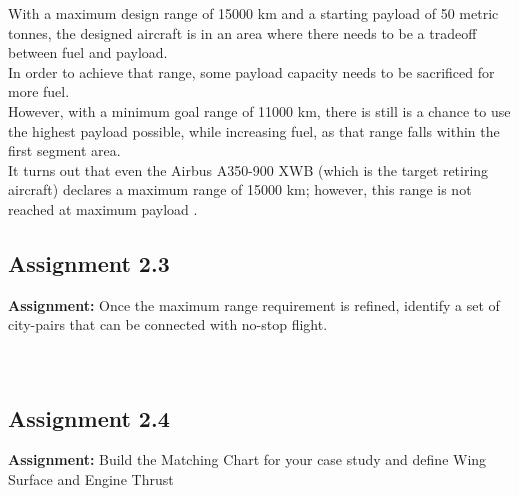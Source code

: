 \documentclass{article}
\begin{document}
With a maximum design range of 15000 km and a starting payload of 50 metric tonnes, 
the designed aircraft is in an area where there needs to be a tradeoff between fuel and payload.\\ 
In order to achieve that range, some payload capacity needs to be sacrificed for more fuel.\\ 
However, with a minimum goal range of 11000 km, there is still is a chance to use the highest payload possible,
while increasing fuel, as that range falls within the first segment area. \\ 
It turns out that even the Airbus A350-900 XWB (which is the target retiring aircraft) declares
a maximum range of 15000 km; however, this range is not reached at maximum payload \autocite{Airbus_A350-900}.

\pagebreak
\subsection{Assignment 2.3\label{Assignment_2.3}}
\textbf{Assignment:} Once the maximum range requirement is refined,
 identify a set of city-pairs that can be connected with no-stop flight. \\ \\ \\ 
\pagebreak 

\subsection{Assignment 2.4\label{Assignment_2.4}}
\textbf{Assignment:} Build the Matching Chart for your case study and define
 Wing Surface and Engine Thrust \\ \\ \\ 

\pagebreak
\printbibliography
    
\end{document}
